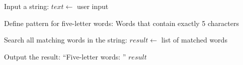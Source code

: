 \begin{algorithm}
\caption{Find All Five-Letter Words in a String}
\begin{algorithmic}[1]

\STATE Input a string:
\STATE $text \gets$ user input

\STATE Define pattern for five-letter words:
\STATE Words that contain exactly 5 characters

\STATE Search all matching words in the string:
\STATE $result \gets$ list of matched words

\STATE Output the result:
\STATE ``Five-letter words: '' $result$

\end{algorithmic}
\end{algorithm}